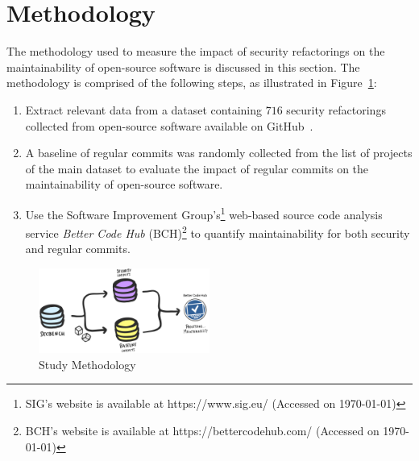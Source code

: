 \documentclass[10pt,conference]{IEEEtran}
\begin{document}
\section{Methodology}\label{sec:methodology}
%
The methodology used to measure the impact of security refactorings on the
maintainability of open-source software is discussed in this section. The
methodology is comprised of the following steps, as illustrated in
Figure~\ref{fig:met}:

\begin{enumerate}
	\item Extract relevant data from a dataset containing $716$ security
	refactorings collected from open-source software available on
	GitHub~\cite{Reis:2017:IJSSE}.
	\item A baseline of regular commits was randomly collected from the list of
	projects of the main dataset to evaluate the impact of regular commits on the
	maintainability of open-source software.
  \item Use the Software Improvement Group's\footnote{SIG's website is available
  at https://www.sig.eu/ (Accessed on \today{})} web-based source code analysis
  service \emph{Better Code Hub} (BCH)\footnote{BCH's website is available at
  https://bettercodehub.com/ (Accessed on \today{})} to quantify maintainability
  for both security and regular commits.
\end{enumerate}

%
\begin{figure}[h]
 	\centering 	\includegraphics[width=0.5\textwidth]{figures/methodology.pdf}
 	\caption{Study Methodology}
	\label{fig:met}
\end{figure}
%
\end{document}

